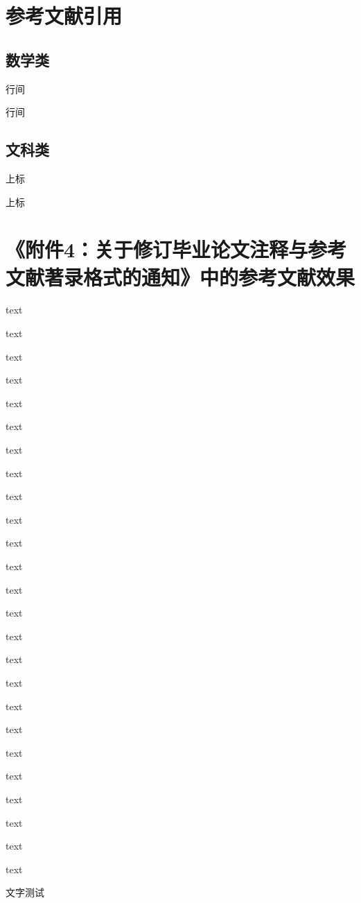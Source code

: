 \section{参考文献引用}

\subsection{数学类}

行间\parencite[thm 3.1]{zurek2014quantum}

行间\parencite{zurek2014quantum}



\subsection{文科类}

上标\cite[test]{zurek2014quantum}

上标\cite{zurek2014quantum}



\section{《附件4：关于修订毕业论文注释与参考文献著录格式的通知》中的参考文献效果}

  text\parencite{李晓东rawtype}

  text\parencite{Ahnrawtype}

  text\parencite{Ahnrawtype}

  text\parencite{丁文祥rawtype}

  text\parencite{邱泽奇会议论文集rawtype}

  text\parencite{雷光春rawtype}

  text\parencite{zhangrawtype}

  text\parencite{邱泽奇会议论文rawtype}

  text\parencite{马克思rawtype}

  text\parencite{昂温rawtype}

  text\parencite{Fothrawtype}

  text\parencite{杨国枢rawtype}

  text\parencite{Morisonrawtype}

  text\parencite{张志祥rawtype}

  text\parencite{徐秀英rawtype}

  text\parencite{Aldemitarawtype}

  text\parencite{张凯军rawtype}

  text\parencite{Kosekrawtype}

  text\parencite{文献编写rawtype}

  text\parencite{国防白皮rawtype}

  text\parencite{federalrawtype}

  text\parencite{healthrawtype}

  text\parencite{江向东rawtype}

  text\parencite{萧钮rawtype}

  text\parencite{Dublinrawtype}

文字测试